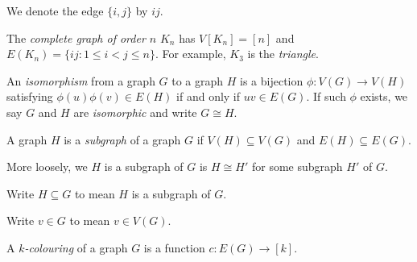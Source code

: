 \documentclass[a4paper]{article}
\begin{document}
\begin{notation}
  We denote the edge \(\{i, j\}\) by \(ij\).
\end{notation}

\begin{eg}
  The \emph{complete graph of order \(n\)} \(K_n\) has \(V[K_n] = [n]\) and \(E(K_n) = \{ij: 1 \leq i < j \leq n\}\). For example, \(K_3\) is the \emph{triangle}.
  \begin{center}

  \end{center}
\end{eg}

\begin{definition}[isomorphism]
  An \emph{isomorphism} from a graph \(G\) to a graph \(H\) is a bijection \(\phi: V(G) \to V(H)\) satisfying \(\phi(u) \phi(v) \in E(H)\) if and only if \(uv \in E(G)\). If such \(\phi\) exists, we say \(G\) and \(H\) are \emph{isomorphic} and write \(G \cong H\).
\end{definition}

\begin{definition}[subgraph]
  A graph \(H\) is a \emph{subgraph} of a graph \(G\) if \(V(H) \subseteq V(G)\) and \(E(H) \subseteq E(G)\).

  More loosely, we \(H\) is a subgraph of \(G\) is \(H \cong H'\) for some subgraph \(H'\) of \(G\).

  Write \(H \subseteq G\) to mean \(H\) is a subgraph of \(G\).
\end{definition}

\begin{notation}
  Write \(v \in G\) to mean \(v \in V(G)\).
\end{notation}

\begin{definition}[colouring]
  A \emph{\(k\)-colouring} of a graph \(G\) is a function \(c: E(G) \to [k]\).
\end{definition}
\end{document}
